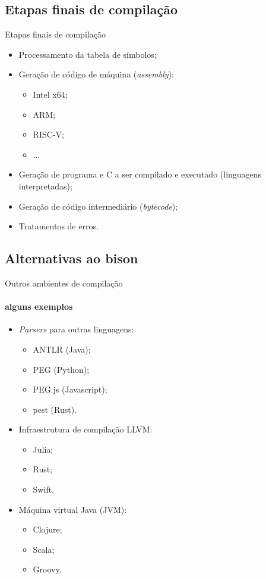 \subsection{Etapas finais de compilação}
\frame{\tableofcontents[currentsubsection]}

\begin{frame}{Etapas finais de compilação}

  \begin{itemize}
  \item Processamento da tabela de símbolos;
  \item Geração de código de máquina ({\it assembly}):
    \begin{itemize}
    \item Intel x64;
    \item ARM;
    \item RISC-V;
    \item $\ldots$
    \end{itemize}
  \item Geração de programa e C a ser compilado e executado
    (linguagens interpretadas);
  \item Geração de código intermediário ({\it bytecode});
  \item Tratamentos de erros.
  \end{itemize}
\end{frame}

\subsection{Alternativas ao bison}
\frame{\tableofcontents[currentsubsection]}

\begin{frame}{Outros ambientes de compilação}
  \framesubtitle{alguns exemplos}
  \begin{itemize}
  \item {\it Parsers} para outras linguagens:
    \begin{itemize}
    \item ANTLR (Java);
    \item PEG (Python);
    \item PEG.js (Javascript);
    \item pest (Rust).
    \end{itemize}
  \item Infraestrutura de compilação LLVM:
    \begin{itemize}
    \item Julia;
    \item Rust;
    \item Swift.
    \end{itemize}
  \item Máquina virtual Java (JVM):
    \begin{itemize}
    \item Clojure;
    \item Scala;
    \item Groovy.
    \end{itemize}
  \end{itemize}
\end{frame}

